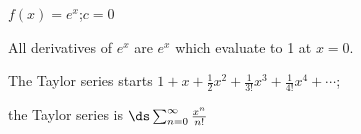 {$f(x) = e^x$;\quad $c=0$
}
{All derivatives of $e^x$ are $e^x$ which evaluate to 1 at $x=0$. 

The Taylor series starts $1+x+\frac12x^2+\frac{1}{3!}x^3+\frac{1}{4!}x^4+\cdots$; 

the Taylor series is $\ds \sum_{n=0}^\infty \frac{x^n}{n!}$
}